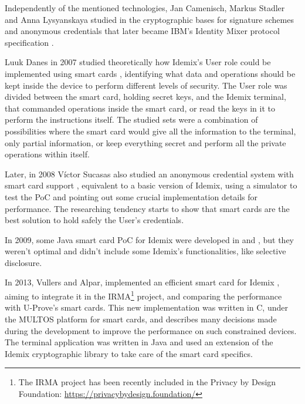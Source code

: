 

\hfil

Independently of the mentioned technologies, Jan Camenisch, Markus Stadler and Anna Lysyanskaya studied in \cite{Camenisch:GroupSig,Camenisch:AnonCred,camenisch2002signature} 
the cryptographic bases for signature schemes and anonymous credentials that later became IBM's Identity Mixer protocol specification \cite{idemixSpec}.


Luuk Danes in 2007 studied theoretically how Idemix's User role could be implemented using  
smart cards \cite{luuk}, identifying what data and operations should be kept inside the device to perform different levels of security. The User role was divided between the smart card, holding secret keys, and the Idemix terminal, that commanded operations inside the smart card, or read the keys in it to perform the instructions itself. The studied sets were a combination of possibilities where the smart card would give all the information to the terminal, only partial information, or keep everything secret and perform all the private operations within itself.

Later, in 2008 V\'ictor Sucasas also studied an anonymous credential system with smart card support \cite{sucasas}, equivalent to a basic version of Idemix, using a simulator to test the PoC and pointing out some crucial implementation details for performance. The researching tendency starts to show that smart cards are the best solution to hold safely the User's credentials.

In 2009, some Java smart card PoC for Idemix were developed in \cite{javaIdemix1} and \cite{javaIdemix2}, but they weren't optimal and didn't include some Idemix's functionalities, like selective disclosure.

In 2013, Vullers and Alpar, implemented an efficient smart card for Idemix \cite{vullers2013efficient}, aiming to integrate it in the IRMA\footnote{The IRMA project has been recently included in the Privacy by Design Foundation: \url{https://privacybydesign.foundation/}} project, and comparing the performance with U-Prove's smart cards. This new implementation was written in C, under the MULTOS platform for smart cards, and describes many decisions made during the development to improve the performance on such constrained devices. The terminal application was written in Java and used an extension of the Idemix cryptographic library to take care of the smart card specifics.


